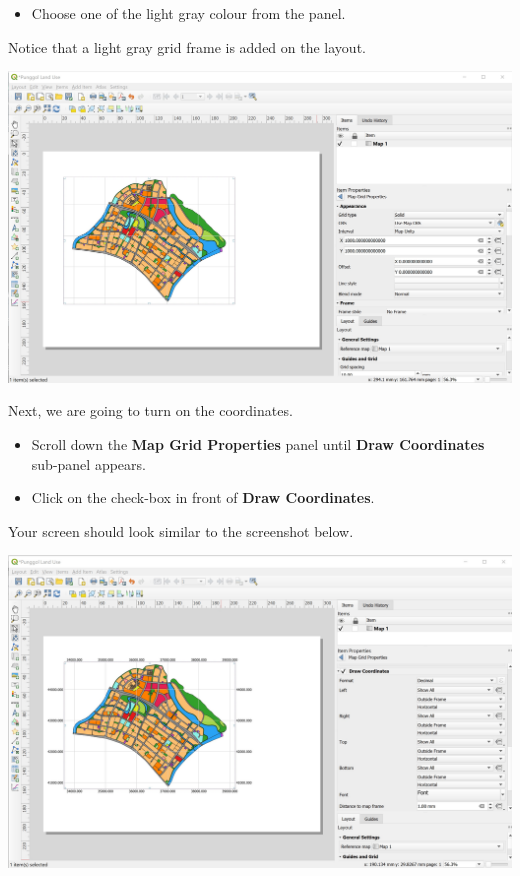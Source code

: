 \documentclass[
  letterpaper,
  DIV=11,
  numbers=noendperiod]{scrreprt}
\providecommand{\tightlist}{%
  \setlength{\itemsep}{0pt}\setlength{\parskip}{0pt}}\usepackage{longtable,booktabs,array}
\begin{document}
\begin{itemize}
\tightlist
\item
  Choose one of the light gray colour from the panel.
\end{itemize}

Notice that a light gray grid frame is added on the layout.

\includegraphics{./img04/image57.jpg}

Next, we are going to turn on the coordinates.

\begin{itemize}
\item
  Scroll down the \textbf{Map Grid Properties} panel until \textbf{Draw
  Coordinates} sub-panel appears.
\item
  Click on the check-box in front of \textbf{Draw Coordinates}.
\end{itemize}

Your screen should look similar to the screenshot below.

\includegraphics{./img04/image58.jpg}
\end{document}
